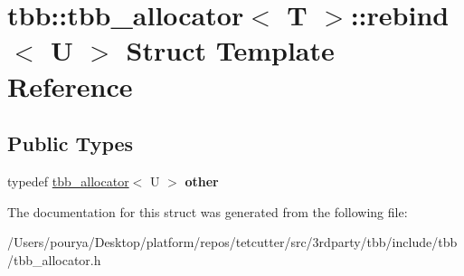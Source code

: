 \hypertarget{structtbb_1_1tbb__allocator_1_1rebind}{}\section{tbb\+:\+:tbb\+\_\+allocator$<$ T $>$\+:\+:rebind$<$ U $>$ Struct Template Reference}
\label{structtbb_1_1tbb__allocator_1_1rebind}
\subsection*{Public Types}
\begin{DoxyCompactItemize}
\item 
\hypertarget{structtbb_1_1tbb__allocator_1_1rebind_adbeadd225df01e2cde9ffe5d92293671}{}typedef \hyperlink{classtbb_1_1tbb__allocator}{tbb\+\_\+allocator}$<$ U $>$ {\bfseries other}\label{structtbb_1_1tbb__allocator_1_1rebind_adbeadd225df01e2cde9ffe5d92293671}

\end{DoxyCompactItemize}


The documentation for this struct was generated from the following file\+:\begin{DoxyCompactItemize}
\item 
/\+Users/pourya/\+Desktop/platform/repos/tetcutter/src/3rdparty/tbb/include/tbb/tbb\+\_\+allocator.\+h\end{DoxyCompactItemize}
